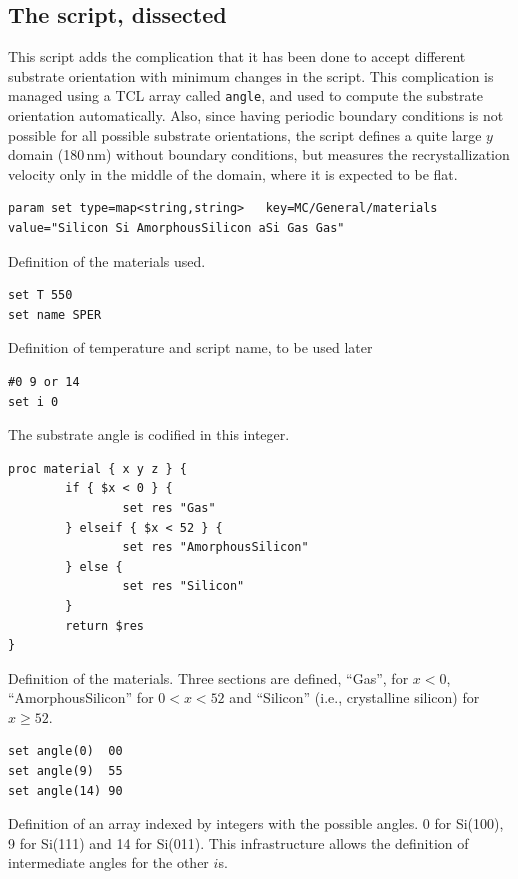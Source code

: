\subsection{The script, dissected}

This script adds the complication that it has been done to accept different substrate orientation with minimum changes in the script. This complication is managed using a TCL array called {\tt angle}, and used to compute the substrate orientation automatically. Also, since having periodic boundary conditions is not possible for all possible substrate orientations, the script defines a quite large $y$ domain (180\,nm) without boundary conditions, but measures the recrystallization velocity only in the middle of the domain, where it is expected to be flat.

\begin{lstlisting}
param set type=map<string,string>   key=MC/General/materials value="Silicon Si AmorphousSilicon aSi Gas Gas"
\end{lstlisting}
Definition of the materials used.

\begin{lstlisting}[firstnumber=3]
set T 550
set name SPER
\end{lstlisting}
Definition of temperature and script name, to be used later

\begin{lstlisting}[firstnumber=5]
#0 9 or 14
set i 0
\end{lstlisting}
The substrate angle is codified in this integer.

\begin{lstlisting}[firstnumber=7]
proc material { x y z } {
        if { $x < 0 } {
                set res "Gas"
        } elseif { $x < 52 } {
                set res "AmorphousSilicon"
        } else {
                set res "Silicon"
        }
        return $res
}
\end{lstlisting}
Definition of the materials. Three sections are defined, ``Gas'', for $x < 0$, ``AmorphousSilicon'' for $0 < x < 52$ and ``Silicon'' (i.e., crystalline silicon) for $x \geq 52$.

\begin{lstlisting}[firstnumber=19]
set angle(0)  00
set angle(9)  55
set angle(14) 90
\end{lstlisting}
Definition of an array indexed by integers with the possible angles. 0 for Si(100), 9 for Si(111) and 14 for Si(011). This infrastructure allows the definition of intermediate angles for the other $i$s.

